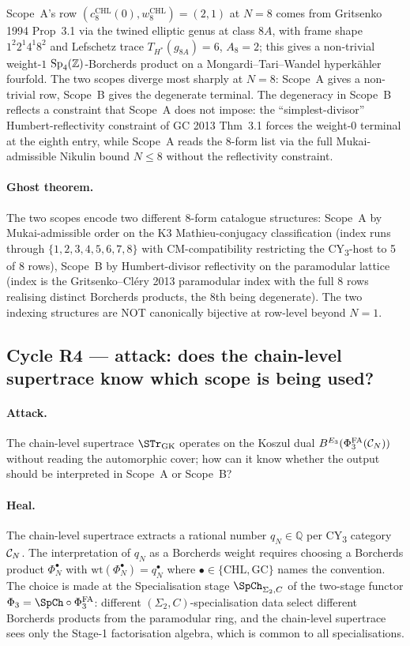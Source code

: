 Scope~A's row $(c_8^{\mathrm{CHL}}(0), w_8^{\mathrm{CHL}}) = (2, 1)$
at $N = 8$ comes from Gritsenko 1994 Prop~3.1 via the twined elliptic
genus at class $8A$, with frame shape $1^2 2^1 4^1 8^2$ and Lefschetz
trace $T_{H^*}(g_{8A}) = 6$, $A_8 = 2$; this gives a non-trivial
weight-$1$ $\mathrm{Sp}_4(\mathbb Z)$-Borcherds product on a Mongardi--Tari--Wandel
hyperk\"ahler fourfold. The two scopes diverge most sharply at $N = 8$:
Scope~A gives a non-trivial row, Scope~B gives the degenerate
terminal. The degeneracy in Scope~B reflects a constraint that
Scope~A does not impose: the ``simplest-divisor'' Humbert-reflectivity
constraint of GC 2013 Thm~3.1 forces the weight-$0$ terminal at the
eighth entry, while Scope~A reads the 8-form list via the full
Mukai-admissible Nikulin bound $N \leq 8$ without the reflectivity
constraint.

\paragraph{Ghost theorem.} The two scopes encode two different
8-form catalogue structures: Scope~A by Mukai-admissible order on the
K3 Mathieu-conjugacy classification (index runs through
$\{1, 2, 3, 4, 5, 6, 7, 8\}$ with CM-compatibility restricting the
CY\textsubscript{3}-host to 5 of 8 rows), Scope~B by Humbert-divisor
reflectivity on the paramodular lattice (index is the
Gritsenko--Cl\'ery 2013 paramodular index with the full 8 rows
realising distinct Borcherds products, the 8th being degenerate). The
two indexing structures are NOT canonically bijective at row-level
beyond $N = 1$.

\subsection*{Cycle R4 --- attack: does the chain-level supertrace
know which scope is being used?}

\paragraph{Attack.} The chain-level supertrace $\STr_{\mathrm{GK}}$
operates on the Koszul dual $B^{E_{3}}(\Phi^{\mathrm{FA}}_3(\mathcal C_N))$ without reading
the automorphic cover; how can it know whether the output should be
interpreted in Scope~A or Scope~B?

\paragraph{Heal.} The chain-level supertrace extracts a rational number
$q_N \in \mathbb Q$ per CY\textsubscript{3} category $\mathcal C_N$. The
interpretation of $q_N$ as a Borcherds weight requires choosing a
Borcherds product $\Phi_N^\bullet$ with $\mathrm{wt}(\Phi_N^\bullet)
= q_N^\bullet$ where $\bullet \in \{\mathrm{CHL}, \mathrm{GC}\}$ names
the convention. The choice is made at the Specialisation stage
$\SpCh_{\Sigma_2, C}$ of the two-stage functor $\Phi_3 = \SpCh \circ
\PhiFAt$: different $(\Sigma_2, C)$-specialisation data select
different Borcherds products from the paramodular ring, and the
chain-level supertrace sees only the Stage-1 factorisation algebra,
which is common to all specialisations.

